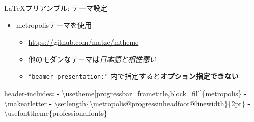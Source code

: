 \documentclass[
  14pt,
  ignorenonframetext,
]{beamer}
\newenvironment{Shaded}{\begin{snugshade}}{\end{snugshade}}
\newcommand{\AttributeTok}[1]{\textcolor[rgb]{0.77,0.63,0.00}{#1}}
\newcommand{\FunctionTok}[1]{\textcolor[rgb]{0.00,0.00,0.00}{#1}}
\newcommand{\KeywordTok}[1]{\textcolor[rgb]{0.13,0.29,0.53}{\textbf{#1}}}
\providecommand{\tightlist}{%
  \setlength{\itemsep}{0pt}\setlength{\parskip}{0pt}}
\begin{document}
\begin{frame}[fragile]{\LaTeX プリアンブル: テーマ設定}
\protect\hypertarget{ux30d7ux30eaux30a2ux30f3ux30d6ux30eb-ux30c6ux30fcux30deux8a2dux5b9a}{}

\begin{itemize}
\tightlist
\item
  metropolisテーマを使用

  \begin{itemize}
  \tightlist
  \item
    \url{https://github.com/matze/mtheme}
  \item
    他のモダンなテーマは\emph{日本語と相性悪い}
  \item
    ``\texttt{beamer\_presentation:}''
    内で指定すると\textbf{オプション指定できない}
  \end{itemize}
\end{itemize}

\begin{Shaded}
\begin{Highlighting}[]
\FunctionTok{header-includes}\KeywordTok{:}
\AttributeTok{  }\KeywordTok{-}\AttributeTok{ \textbackslash{}usetheme[progressbar=frametitle,block=fill]\{metropolis\}}
\AttributeTok{  }\KeywordTok{-}\AttributeTok{ \textbackslash{}makeatletter}
\AttributeTok{  }\KeywordTok{-}\AttributeTok{ \textbackslash{}setlength\{\textbackslash{}metropolis@progressinheadfoot@linewidth\}\{2pt\}}
\AttributeTok{  }\KeywordTok{-}\AttributeTok{ \textbackslash{}usefonttheme\{professionalfonts\}}
\end{Highlighting}
\end{Shaded}

\end{frame}
\end{document}

